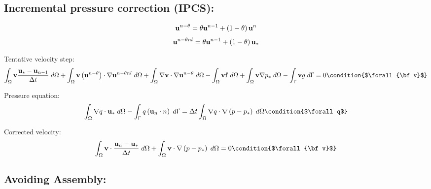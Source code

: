 \documentclass[11pt,a4paper]{article}
\title{}
\author{Samuel Parkinson}
\date{\today}
\begin{document}
\subsection{Incremental pressure correction (IPCS):}

\begin{dmath}
  {\bf u}^{n-\theta} = \theta {\bf u}^{n-1} + \left(1 - \theta \right) {\bf u}^{n}
\end{dmath}
\begin{dmath}
  {\bf u}^{n-\theta nl} = \theta {\bf u}^{n-1} + \left(1 - \theta \right) {\bf u}_*
\end{dmath}

Tentative velocity step:
\begin{dmath}
  \int_\Omega {\bf v} \frac{{\bf u}_* - {\bf u}_{n-1}}{\Delta t} \; d\Omega + \int_\Omega {\bf v} \left( {\bf u}^{n-\theta} \right) \cdot \nabla {\bf u}^{n-\theta nl} \; d\Omega + \int_\Omega \nabla {\bf v} \cdot \nabla {\bf u}^{n-\theta} \; d\Omega - \int_\Omega {\bf v} {\bf f} \; d\Omega + \int_\Omega {\bf v} \nabla p_* \; d\Omega \\ - \int_\Upgamma {\bf v} g \; d\Upgamma = 0 \condition{$\forall {\bf v}$}
\end{dmath}

Pressure equation:
\begin{dmath}
  \int_\Omega \nabla q \cdot {\bf u}_* \; d\Omega - \int_\Upgamma q \left( {\bf u}_{n} \cdot n \right) \; d\Upgamma = \Delta t \int_\Omega \nabla q \cdot \nabla \left(p - p_* \right) \; d\Omega  \condition{$\forall q$}
\end{dmath}

Corrected velocity:
\begin{dmath}
  \int_\Omega {\bf v} \cdot \frac{{\bf u}_n - {\bf u}_*}{\Delta t} \; d\Omega + \int_\Omega {\bf v} \cdot \nabla \left(p - p_* \right) \; d\Omega = 0 \condition{$\forall {\bf v}$}
\end{dmath}

\subsection{Avoiding Assembly:}
\end{document}
